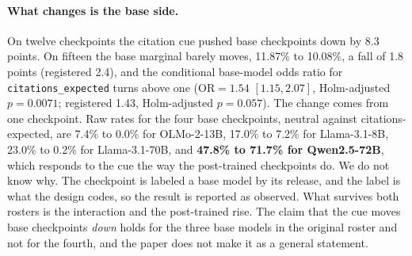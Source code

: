 \paragraph{What changes is the base side.}
On twelve checkpoints the citation cue pushed base checkpoints down by 8.3
points. On fifteen the base marginal barely moves, 11.87\% to 10.08\%, a fall of
1.8 points (registered 2.4), and the conditional base-model odds ratio for
\texttt{citations\_expected} turns above one ($\mathrm{OR} = 1.54$
$[1.15, 2.07]$, Holm-adjusted $p = 0.0071$; registered 1.43, Holm-adjusted
$p = 0.057$). The change comes from one checkpoint. Raw rates for the four base
checkpoints, neutral against citations-expected, are 7.4\% to 0.0\% for
OLMo-2-13B, 17.0\% to 7.2\% for Llama-3.1-8B, 23.0\% to 0.2\% for
Llama-3.1-70B, and \textbf{47.8\% to 71.7\% for Qwen2.5-72B}, which responds to
the cue the way the post-trained checkpoints do. We do not know why. The
checkpoint is labeled a base model by its release, and the label is what the
design codes, so the result is reported as observed. What survives both rosters
is the interaction and the post-trained rise. The claim that the cue moves base
checkpoints \emph{down} holds for the three base models in the original roster
and not for the fourth, and the paper does not make it as a general statement.

